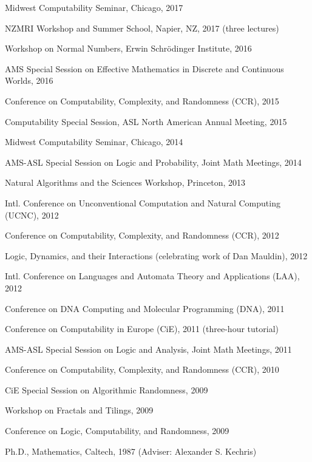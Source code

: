 \documentclass[12pt]{article}
\begin{document}
\indent Midwest Computability Seminar, Chicago, 2017

\indent NZMRI Workshop and Summer School, Napier, NZ, 2017 (three lectures) 

\indent Workshop on Normal Numbers, Erwin Schr\"{o}dinger Institute, 2016

\indent AMS Special Session on Effective Mathematics in Discrete and Continuous Worlds, 2016

\indent Conference on Computability, Complexity, and Randomness (CCR), 2015

\indent Computability Special Session, ASL North American Annual Meeting, 2015

\indent Midwest Computability Seminar, Chicago, 2014

\indent AMS-ASL Special Session on Logic and Probability, Joint Math Meetings, 2014

\indent Natural Algorithms and the Sciences Workshop, Princeton, 2013

\indent Intl. Conference on Unconventional Computation and Natural Computing (UCNC), 2012

\indent Conference on Computability, Complexity, and Randomness (CCR), 2012

\indent Logic, Dynamics, and their Interactions (celebrating work of Dan Mauldin), 2012

\indent Intl. Conference on Languages and Automata Theory and Applications (LAA), 2012

\indent Conference on DNA Computing and Molecular Programming (DNA), 2011

\indent Conference on Computability in Europe (CiE), 2011 (three-hour tutorial)

\indent AMS-ASL Special Session on Logic and Analysis, Joint Math Meetings, 2011

\indent Conference on Computability, Complexity, and Randomness (CCR), 2010

\indent CiE Special Session on Algorithmic Randomness, 2009

\indent Workshop on Fractals and Tilings, 2009

\indent Conference on Logic, Computability, and Randomness, 2009



\vspace{0.2cm}


   
\indent Ph.D., Mathematics, Caltech, 1987 (Adviser: Alexander S. Kechris)
\end{document}
